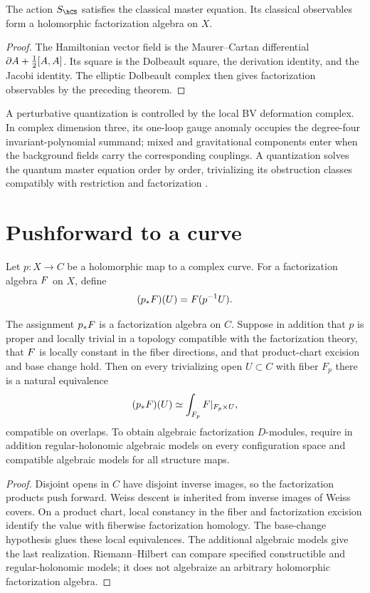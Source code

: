 \begin{theorem}
The action $S_{\hCS}$ satisfies the classical master equation. Its classical observables form a holomorphic factorization algebra on $X$.
\end{theorem}
\begin{proof}
The Hamiltonian vector field is the Maurer--Cartan differential $\partial A+\frac12[A,A]$. Its square is the Dolbeault square, the derivation identity, and the Jacobi identity. The elliptic Dolbeault complex then gives factorization observables by the preceding theorem.
\end{proof}

A perturbative quantization is controlled by the local BV deformation complex. In complex dimension three, its one-loop gauge anomaly occupies the degree-four invariant-polynomial summand; mixed and gravitational components enter when the background fields carry the corresponding couplings. A quantization solves the quantum master equation order by order, trivializing its obstruction classes compatibly with restriction and factorization \cite{CostelloLiAnomaly}.

\section{Pushforward to a curve}
Let $p:X\to C$ be a holomorphic map to a complex curve. For a factorization algebra $F$ on $X$, define
\[
 (p_*F)(U)=F(p^{-1}U).
\]

\begin{theorem}
The assignment $p_*F$ is a factorization algebra on $C$. Suppose in addition that $p$ is proper and locally trivial in a topology compatible with the factorization theory, that $F$ is locally constant in the fiber directions, and that product-chart excision and base change hold. Then on every trivializing open $U\subset C$ with fiber $F_p$ there is a natural equivalence
\[
 (p_*F)(U)\simeq
 \int_{F_p}F|_{F_p\times U},
\]
compatible on overlaps. To obtain algebraic factorization $D$-modules, require in addition
regular-holonomic algebraic models on every configuration space and
compatible algebraic models for all structure maps.
\end{theorem}
\begin{proof}
Disjoint opens in $C$ have disjoint inverse images, so the factorization products push forward. Weiss descent is inherited from inverse images of Weiss covers. On a product chart, local constancy in the fiber and factorization excision identify the value with fiberwise factorization homology. The base-change hypothesis glues these local equivalences. The additional algebraic models give the last realization.
Riemann--Hilbert can compare specified constructible and regular-holonomic
models; it does not algebraize an arbitrary holomorphic factorization algebra.
\end{proof}

